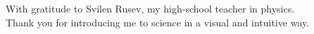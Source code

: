 \thispagestyle{empty}
{}

\vspace*{3cm}

\begin{center}
    With gratitude to Svilen Rusev, my high-school teacher in physics.\\
    Thank you for introducing me to science in a visual and intuitive way.
\end{center}

\medskip
